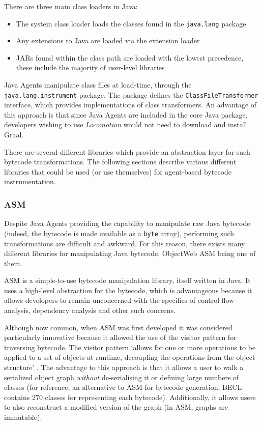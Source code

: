 		There are three main class loaders in Java:
		
		\begin{itemize}
			\item The system class loader loads the classes found in the \texttt{java.lang} package
			\item Any extensions to Java are loaded via the extension loader
			\item JARs found within the class path are loaded with the lowest precedence, these include the majority of user-level libraries
		\end{itemize}
		
		Java Agents manipulate class files at load-time, through the \texttt{java.lang.instrument} package. The package defines the \texttt{ClassFileTransformer} interface, which provides implementations of class transformers. An advantage of this approach is that since Java Agents are included in the core Java package, developers wishing to use \textit{Locomotion} would not need to download and install Graal.
		
		There are several different libraries which provide an abstraction layer for such bytecode transformations. The following sections describe various different libraries that could be used (or use themselves) for agent-based bytecode instrumentation.

		\subsubsection{ASM} \label{sec:instrumentation/bytecode-instr/asm}
		Despite Java Agents providing the capability to manipulate raw Java bytecode (indeed, the bytecode is made available as a \texttt{byte} array), performing such transformations are difficult and awkward. For this reason, there exists many different libraries for manipulating Java bytecode, ObjectWeb ASM being one of them.
		
		ASM \citep{Bruneton2002} is a simple-to-use bytecode manipulation library, itself written in Java. It uses a high-level abstraction for the bytecode, which is advantageous because it allows developers to remain unconcerned with the specifics of control flow analysis, dependency analysis and other such concerns.
		
		Although now common, when ASM was first developed it was considered particularly innovative because it allowed the use of the visitor pattern \citep[p.~331]{Gamma1995} for traversing bytecode. The visitor pattern `allows for one or more operations to be applied to a set of objects at runtime, decoupling the operations from the object structure' \citep{McDonald2008}. The advantage to this approach is that it allows a user to walk a serialized object graph \emph{without} de-serialising it or defining large numbers of classes (for reference, an alternative to ASM for bytecode generation, BECL \citep{ApacheBECL} contains 270 classes for representing each bytecode). Additionally, it allows users to also reconstruct a modified version of the graph (in ASM, graphs are immutable).
		
